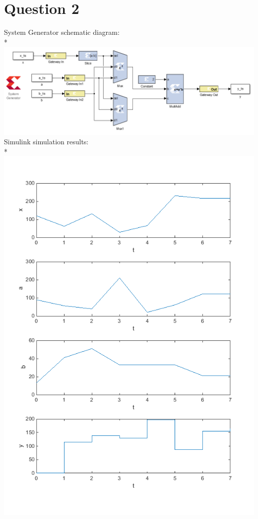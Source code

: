 \documentclass[11pt]{article}
\begin{document}
\section*{Question 2}
System Generator schematic diagram:\\*
\includegraphics[width=\linewidth]{q2/model.png}\\
Simulink simulation results:\\*
\includegraphics[width=\linewidth]{q2/data_plot.png}
\end{document}
